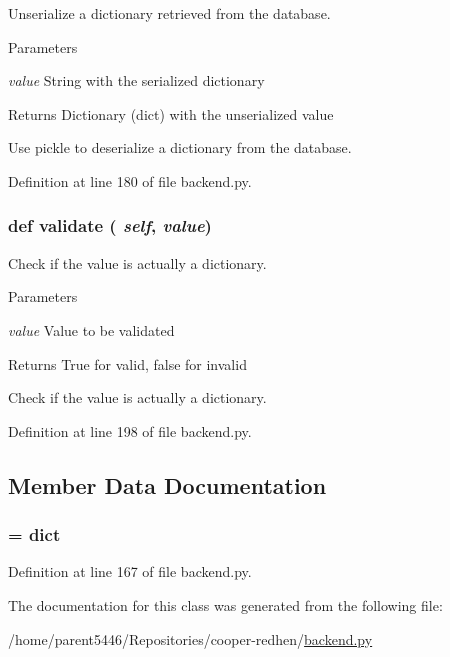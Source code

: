 Unserialize a dictionary retrieved from the database. 
\begin{DoxyParams}{Parameters}
\item[{\em value}]String with the serialized dictionary \end{DoxyParams}
\begin{DoxyReturn}{Returns}
Dictionary (dict) with the unserialized value\begin{DoxyVerb}Use pickle to deserialize a dictionary from the database.\end{DoxyVerb}
 
\end{DoxyReturn}


Definition at line 180 of file backend.py.\hypertarget{classbackend_1_1_dict_property_a8f3dc5c8aaf85c281c2f52cda259aa56}{
\subsubsection[{validate}]{\setlength{\rightskip}{0pt plus 5cm}def validate ( {\em self}, \/   {\em value})}}
\label{classbackend_1_1_dict_property_a8f3dc5c8aaf85c281c2f52cda259aa56}


Check if the value is actually a dictionary. 
\begin{DoxyParams}{Parameters}
\item[{\em value}]Value to be validated \end{DoxyParams}
\begin{DoxyReturn}{Returns}
True for valid, false for invalid\begin{DoxyVerb}Check if the value is actually a dictionary.\end{DoxyVerb}
 
\end{DoxyReturn}


Definition at line 198 of file backend.py.

\subsection{Member Data Documentation}
\hypertarget{classbackend_1_1_dict_property_ac2ad7f431e3446fddcd9b6b9f93c4c14}{
\subsubsection[{data\_\-type}]{ = dict}}
\label{classbackend_1_1_dict_property_ac2ad7f431e3446fddcd9b6b9f93c4c14}


Definition at line 167 of file backend.py.

The documentation for this class was generated from the following file:\begin{DoxyCompactItemize}
\item 
/home/parent5446/Repositories/cooper-\/redhen/\hyperlink{backend_8py}{backend.py}\end{DoxyCompactItemize}
